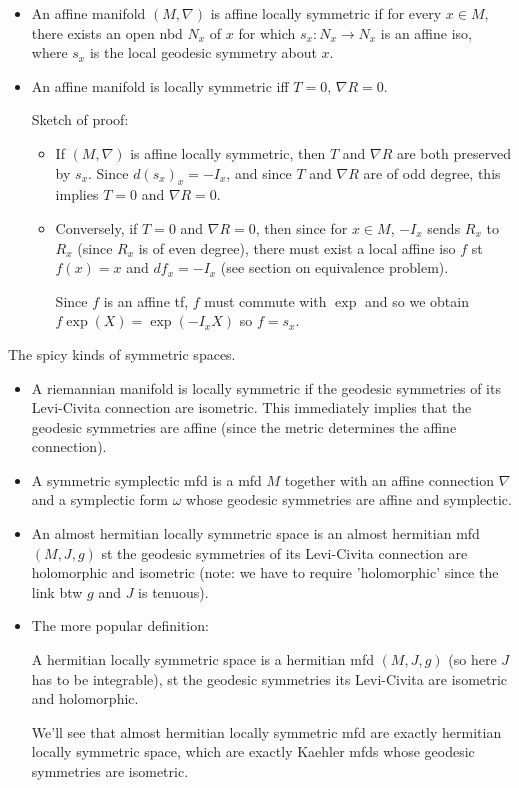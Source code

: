 \documentclass{report}
\theoremstyle{definition}
\begin{document}
\begin{itemize}
    \item An affine manifold $(M,\nabla)$ is affine locally symmetric if for every $x\in M$, there exists an open nbd $N_x$ of $x$ for which $s_x:N_x\to N_x$ is an affine iso, where $s_x$ is the local geodesic symmetry about $x$.
    \item An affine manifold is locally symmetric iff $T=0$, $\nabla R=0$.

    Sketch of proof:
    \begin{itemize}
        \item If $(M,\nabla)$ is affine locally symmetric, then $T$ and $\nabla R$ are both preserved by $s_x$. Since $d(s_x)_x=-I_x$, and since $T$ and $\nabla R$ are of odd degree, this implies $T=0$ and $\nabla R=0$.
        \item Conversely, if $T=0$ and $\nabla R=0$, then since for $x\in M$, $-I_x$ sends $R_x$ to $R_x$ (since $R_x$ is of even degree), there must exist a local affine iso $f$ st $f(x)=x$ and $df_x=-I_x$ (see section on equivalence problem).

        Since $f$ is an affine tf, $f$ must commute with $\exp$ and so we obtain $f\exp(X)=\exp(-I_xX)$ so $f=s_x$.
    \end{itemize}
\end{itemize}

The spicy kinds of symmetric spaces.
\begin{itemize}
    \item A riemannian manifold is locally symmetric if the geodesic symmetries of its Levi-Civita connection are isometric. This immediately implies that the geodesic symmetries are affine (since the metric determines the affine connection).
    \item A symmetric symplectic mfd is a mfd $M$ together with an affine connection $\nabla$ and a symplectic form $\omega$ whose geodesic symmetries are affine and symplectic.
    \item An almost hermitian locally symmetric space is an almost hermitian mfd $(M,J,g)$ st the geodesic symmetries of its Levi-Civita connection are holomorphic and isometric (note: we have to require 'holomorphic' since the link btw $g$ and $J$ is tenuous).
    \item The more popular definition:
    
    A hermitian locally symmetric space is a hermitian mfd $(M,J,g)$ (so here $J$ has to be integrable), st the geodesic symmetries its Levi-Civita are isometric and holomorphic.

    We'll see that almost hermitian locally symmetric mfd are exactly hermitian locally symmetric space, which are exactly Kaehler mfds whose geodesic symmetries are isometric.
\end{itemize}
\end{document}
